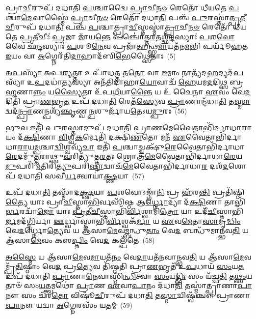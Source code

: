 𑌪𑍍𑌰𑌾\-\ul{𑌚𑍀}\-𑌰𑍁𑌪᳴ 𑌦𑌧𑌾𑌤𑌿 \ul{𑌪}\-𑌶𑍍𑌚𑌾𑌦𑍍𑌵𑍈 \ul{𑌪𑍍𑌰𑌾}\-𑌚𑍀\-\ul{𑌨}\-\-\ul{𑍞} 𑌰𑍇𑌤𑍋᳴ 𑌧𑍀𑌯𑌤𑍇 \ul{𑌪}\-𑌶𑍍𑌚𑌾\-\ul{𑌦𑍇}\-𑌵𑌾𑌸𑍍𑌮𑍈॑ \ul{𑌪𑍍𑌰𑌾}\-𑌚𑍀\-\ul{𑌨}\-\-\ul{𑍞} 𑌰𑍇𑌤𑍋᳴ 𑌦𑌧𑌾\-\ul{𑌤𑌿} 𑌪𑌞𑍍𑌚᳴ \ul{𑌪𑍁}\-𑌰𑌸𑍍𑌤𑌾॑\-\ul{𑌤𑍍𑌪𑍍𑌰}\-𑌤𑍀\-\ul{𑌚𑍀}\-𑌰𑍁𑌪᳴ 𑌦𑌧𑌾\-\ul{𑌤𑌿} 𑌪𑌞𑍍𑌚᳴ \ul{𑌪}\-𑌶𑍍𑌚𑌾𑌤𑍍𑌪𑍍𑌰𑌾\-\ul{𑌚𑍀}\-𑌸𑍍𑌤𑌸𑍍𑌮𑌾॑\-\ul{𑌤𑍍𑌪𑍍𑌰𑌾}\-𑌚𑍀\-\ul{𑌨}\-\-\ul{𑍞} 𑌰𑍇𑌤𑍋᳴ 𑌧𑍀𑌯𑌤𑍇 \ul{𑌪𑍍𑌰}\-𑌤𑍀𑌚𑍀𑌃॑ \ul{𑌪𑍍𑌰}\-𑌜𑌾 𑌜𑌾᳴𑌯\-\ul{𑌨𑍍𑌤𑍇} 𑌪𑌞𑍍𑌚𑍋॑𑌤𑍍𑌤\-\ul{𑌰}\-𑌤𑌶𑍍𑌛᳴\-\ul{𑌨𑍍𑌦}\-𑌸𑍍𑌯𑌾𑌃॑ \ul{𑌪}\-𑌶\-\ul{𑌵𑍋} 𑌵𑍈 𑌛᳴\-\ul{𑌨𑍍𑌦}\-𑌸𑍍𑌯𑌾𑌃॑ \ul{𑌪}\-𑌶𑍂\-\ul{𑌨𑍇}\-𑌵 𑌪𑍍𑌰𑌜𑌾᳴\-\ul{𑌤𑌾}\-𑌨𑍍𑌥𑍍𑌸𑍍𑌵\-\ul{𑌮𑌾}\-𑌯𑌤᳴𑌨\-\ul{𑌮}\-𑌭𑌿 𑌪𑌰𑍍𑌯𑍂᳴𑌹𑌤 \ul{𑌇}\-𑌯𑌂 𑌵𑌾 \ul{𑌅}\-𑌗𑍍𑌨𑍇𑌰᳴𑌤𑌿\-\ul{𑌦𑌾}\-𑌹𑌾𑌦᳴𑌬𑌿\-\ul{𑌭𑍇}\-𑌥𑍍𑌸𑍈𑌤𑌾𑌃~(5)

\-\ul{𑌅}\-\-\ul{𑌪}\-𑌸𑍍𑌯𑌾᳴ 𑌅𑌪\-\ul{𑌶𑍍𑌯}\-𑌤𑍍𑌤𑌾 𑌉𑌪𑌾᳴𑌧\-\ul{𑌤𑍍𑌤} 𑌤\-\ul{𑌤𑍋} 𑌵𑌾 \ul{𑌇}\-𑌮𑌾𑌂 𑌨𑌾𑌤𑍍𑌯᳴𑌦\-\ul{𑌹}\-𑌦𑍍𑌯𑌦᳴\-\ul{𑌪}\-𑌸𑍍𑌯𑌾᳴ 𑌉\-\ul{𑌪}\-𑌦𑌧𑌾॑\-\ul{𑌤𑍍𑌯}\-𑌸𑍍𑌯𑌾 𑌅𑌨᳴𑌤𑌿𑌦𑌾𑌹𑌾\-\ul{𑌯𑍋}\-𑌵𑌾𑌚᳴ \ul{𑌹𑍇}\-𑌯𑌮\-\ul{𑌦}\-𑌦𑌿𑌥𑍍𑌸 𑌬𑍍𑌰\-\ul{𑌹𑍍𑌮}\-𑌣𑌾\-\ul{𑌨𑍍𑌨𑌂} 𑌯\-\ul{𑌸𑍍𑌯𑍈}\-𑌤𑌾 𑌉᳴𑌪\-\ul{𑌧𑍀}\-𑌯𑌾\-\ul{𑌨𑍍𑌤𑍈} 𑌯 𑌉᳴ 𑌚𑍈𑌨𑌾 \ul{𑌏}\-𑌵𑌂 𑌵𑍇\-\ul{𑌦}\-𑌦𑌿𑌤𑌿᳴ 𑌪𑍍𑌰𑌾\-\ul{𑌣}\-𑌭𑍃\-\ul{𑌤} 𑌉𑌪᳴ 𑌦𑌧𑌾\-\ul{𑌤𑌿} 𑌰𑍇𑌤᳴\-\ul{𑌸𑍍𑌯𑍇}\-𑌵 \ul{𑌪𑍍𑌰𑌾}\-𑌣𑌾𑌨𑍍𑌦᳴𑌧𑌾\-\ul{𑌤𑌿} 𑌤\-\ul{𑌸𑍍𑌮𑌾}\-𑌦𑍍𑌵𑌦᳴\-\ul{𑌨𑍍𑌪𑍍𑌰𑌾}\-𑌣𑌨𑍍𑌪𑌶𑍍𑌯᳴\-\ul{𑌞𑍍𑌛𑍃}\-𑌣𑍍𑌵\-\ul{𑌨𑍍𑌪}\-𑌶𑍁𑌰𑍍𑌜𑌾᳴𑌯\-\ul{𑌤𑍇}\-\-𑌽𑌯\-\ul{𑌮𑍍𑌪𑍁}\-𑌰𑌃~(56)

𑌭𑍁\-\ul{𑌵} 𑌇𑌤𑌿᳴ \ul{𑌪𑍁}\-𑌰\-\ul{𑌸𑍍𑌤𑌾}\-𑌦𑍁𑌪᳴ 𑌦𑌧𑌾𑌤𑌿 \ul{𑌪𑍍𑌰𑌾}\-𑌣\-\ul{𑌮𑍇}\-𑌵𑍈𑌤𑌾𑌭𑌿᳴𑌰𑍍𑌦𑌾𑌧𑌾\-\ul{𑌰𑌾}\-𑌯𑌂 𑌦᳴\-\ul{𑌕𑍍𑌷𑌿}\-𑌣𑌾 \ul{𑌵𑌿}\-𑌶𑍍𑌵\-\ul{𑌕}\-𑌰𑍍𑌮𑍇𑌤𑌿᳴ 𑌦𑌕𑍍𑌷𑌿\-\ul{𑌣}\-𑌤𑍋 𑌮𑌨᳴ \ul{𑌏}\-𑌵𑍈𑌤𑌾𑌭𑌿᳴𑌰𑍍𑌦𑌾𑌧𑌾\-\ul{𑌰𑌾}\-𑌯\-\ul{𑌮𑍍𑌪}\-𑌶𑍍𑌚𑌾\-\ul{𑌦𑍍𑌵𑌿}\-𑌶𑍍𑌵𑌵𑍍𑌯᳴\-\ul{𑌚𑌾} 𑌇𑌤𑌿᳴ \ul{𑌪}\-𑌶𑍍𑌚𑌾𑌚𑍍𑌚𑌕𑍍𑌷𑍁᳴\-\ul{𑌰𑍇}\-𑌵𑍈𑌤𑌾𑌭𑌿᳴𑌰𑍍𑌦𑌾𑌧𑌾\-\ul{𑌰𑍇}\-𑌦𑌮𑍁᳴\-\ul{𑌤𑍍𑌤}\-𑌰𑌾𑌥𑍍𑌸𑍁\-\ul{𑌵}\-𑌰𑌿𑌤𑍍𑌯𑍁᳴𑌤𑍍𑌤\-\ul{𑌰}\-𑌤𑌃 𑌶𑍍𑌰𑍋𑌤𑍍𑌰᳴\-\ul{𑌮𑍇}\-𑌵𑍈𑌤𑌾𑌭𑌿᳴𑌰𑍍𑌦𑌾𑌧𑌾\-\ul{𑌰𑍇}\-𑌯\-\ul{𑌮𑍁}\-𑌪𑌰𑌿᳴ \ul{𑌮}\-𑌤𑌿𑌰𑌿\-\ul{𑌤𑍍𑌯𑍁}\-𑌪𑌰𑌿᳴\-\ul{𑌷𑍍𑌟𑌾}\-𑌦𑍍𑌵𑌾𑌚᳴\-\ul{𑌮𑍇}\-𑌵𑍈𑌤𑌾𑌭𑌿᳴𑌰𑍍𑌦𑌾𑌧𑌾\-\ul{𑌰} 𑌦𑌶᳴\-\ul{𑌦}\-𑌶𑍋𑌪᳴ 𑌦𑌧𑌾𑌤𑌿 𑌸𑌵𑍀\-\ul{𑌰𑍍𑌯}\-𑌤𑍍𑌵𑌾𑌯𑌾॑\-\ul{𑌕𑍍𑌷𑍍𑌣}\-𑌯𑌾~(57)

𑌉𑌪᳴ 𑌦𑌧𑌾\-\ul{𑌤𑌿} 𑌤𑌸𑍍𑌮𑌾᳴𑌦\-\ul{𑌕𑍍𑌷𑍍𑌣}\-𑌯𑌾 \ul{𑌪}\-𑌶𑌵𑍋\-𑌽𑌙𑍍𑌗𑌾᳴\-\ul{𑌨𑌿} 𑌪𑍍𑌰 𑌹᳴𑌰\-\ul{𑌨𑍍𑌤𑌿} 𑌪𑍍𑌰𑌤𑌿᳴𑌷𑍍𑌠𑌿\-\ul{𑌤𑍍𑌯𑍈} 𑌯𑌾𑌃 𑌪𑍍𑌰𑌾\-\ul{𑌚𑍀}\-𑌸𑍍𑌤𑌾\-\ul{𑌭𑌿}\-𑌰𑍍𑌵𑌸𑌿᳴𑌷𑍍𑌠 𑌆\-\ul{𑌰𑍍𑌧𑍍𑌨𑍋}\-𑌦𑍍𑌯𑌾 𑌦᳴\-\ul{𑌕𑍍𑌷𑌿}\-𑌣𑌾 𑌤𑌾𑌭𑌿᳴\-\ul{𑌰𑍍𑌭}\-𑌰𑌦𑍍𑌵𑌾᳴\-\ul{𑌜𑍋} 𑌯𑌾𑌃 \ul{𑌪𑍍𑌰}\-𑌤𑍀\-\ul{𑌚𑍀}\-𑌸𑍍𑌤𑌾𑌭𑌿᳴\-\ul{𑌰𑍍𑌵𑌿}\-𑌶𑍍𑌵𑌾𑌮𑌿᳴\-\ul{𑌤𑍍𑌰𑍋} 𑌯𑌾 𑌉𑌦𑍀᳴\-\ul{𑌚𑍀}\-𑌸𑍍𑌤𑌾𑌭𑌿᳴\-\ul{𑌰𑍍𑌜}\-𑌮𑌦᳴\-\ul{𑌗𑍍𑌨𑌿}\-𑌰𑍍𑌯𑌾 \ul{𑌊}\-𑌰𑍍𑌧𑍍𑌵𑌾𑌸𑍍𑌤𑌾𑌭𑌿᳴\-\ul{𑌰𑍍𑌵𑌿}\-𑌶𑍍𑌵𑌕᳴\-\ul{𑌰𑍍𑌮𑌾} 𑌯 \ul{𑌏}\-𑌵\-\ul{𑌮𑍇}\-𑌤𑌾\-\ul{𑌸𑌾}\-𑌮𑍃\-\ul{𑌦𑍍𑌧𑌿𑌂} 𑌵𑍇\-\ul{𑌦}\-𑌰𑍍𑌧𑍍𑌨𑍋\-\ul{𑌤𑍍𑌯𑍇}\-𑌵 𑌯 𑌆᳴𑌸𑌾\-\ul{𑌮𑍇}\-𑌵\-\ul{𑌮𑍍𑌬}\-𑌨𑍍𑌧𑍁\-\ul{𑌤𑌾𑌂} 𑌵𑍇\-\ul{𑌦} 𑌬𑌨𑍍𑌧𑍁᳴𑌮𑌾𑌨𑍍𑌭𑌵\-\ul{𑌤𑌿} 𑌯 𑌆᳴𑌸𑌾\-\ul{𑌮𑍇}\-𑌵𑌂 𑌕𑍢\-\ul{𑌪𑍍𑌤𑌿𑌂} 𑌵𑍇\-\ul{𑌦} 𑌕𑌲𑍍𑌪᳴𑌤𑍇~(58)

\-\ul{𑌅}\-\-\ul{𑌸𑍍𑌮𑍈} 𑌯 𑌆᳴𑌸𑌾\-\ul{𑌮𑍇}\-𑌵\-\ul{𑌮𑌾}\-𑌯𑌤᳴\-\ul{𑌨𑌂} 𑌵𑍇\-\ul{𑌦𑌾}\-𑌯𑌤᳴𑌨𑌵𑌾𑌨𑍍𑌭𑌵\-\ul{𑌤𑌿} 𑌯 𑌆᳴𑌸𑌾\-\ul{𑌮𑍇}\-𑌵𑌮𑍍𑌪𑍍𑌰᳴\-\ul{𑌤𑌿}\-𑌷𑍍𑌠𑌾𑌂 𑌵𑍇\-\ul{𑌦} 𑌪𑍍𑌰\-\ul{𑌤𑍍𑌯𑍇}\-𑌵 𑌤𑌿᳴𑌷𑍍𑌠𑌤𑌿 𑌪𑍍𑌰𑌾\-\ul{𑌣}\-𑌭𑍃𑌤᳴ 𑌉\-\ul{𑌪}\-𑌧𑌾𑌯᳴ \ul{𑌸𑌂}\-𑌯\-\ul{𑌤} 𑌉𑌪᳴ 𑌦𑌧𑌾𑌤𑌿 \ul{𑌪𑍍𑌰𑌾}\-𑌣𑌾\-\ul{𑌨𑍇}\-𑌵𑌾𑌸𑍍𑌮𑌿᳴\-\ul{𑌨𑍍𑌧𑌿}\-𑌤𑍍𑌵𑌾 \ul{𑌸𑌂}\-𑌯\-\ul{𑌦𑍍𑌭𑌿𑌃} 𑌸𑌂 𑌯᳴𑌚𑍍𑌛\-\ul{𑌤𑌿} 𑌤\-\ul{𑌥𑍍𑌸𑌂}\-𑌯𑌤𑌾𑍞᳴ 𑌸𑌂\-\ul{𑌯}\-𑌤𑍍𑌤𑍍𑌵𑌮𑌥𑍋॑ \ul{𑌪𑍍𑌰𑌾}\-𑌣 \ul{𑌏}\-𑌵𑌾\-\ul{𑌪𑌾}\-𑌨𑌂 𑌦᳴𑌧𑌾\-\ul{𑌤𑌿} 𑌤𑌸𑍍𑌮𑌾॑𑌤𑍍𑌪𑍍𑌰𑌾𑌣𑌾\-\ul{𑌪𑌾}\-𑌨𑍗 𑌸𑌂 𑌚᳴𑌰\-\ul{𑌤𑍋} 𑌵𑌿𑌷𑍂᳴\-\ul{𑌚𑍀}\-𑌰𑍁𑌪᳴ 𑌦𑌧𑌾\-\ul{𑌤𑌿} 𑌤\-\ul{𑌸𑍍𑌮𑌾}\-𑌦𑍍𑌵𑌿𑌷𑍍𑌵᳴𑌞𑍍𑌚𑍗 𑌪𑍍𑌰𑌾𑌣𑌾\-\ul{𑌪𑌾}\-𑌨𑍗 𑌯𑌦𑍍𑌵𑌾 \ul{𑌅}\-𑌗𑍍𑌨𑍇𑌰𑌸𑌂᳴ 𑌯𑌤𑌮𑍍~(59)

